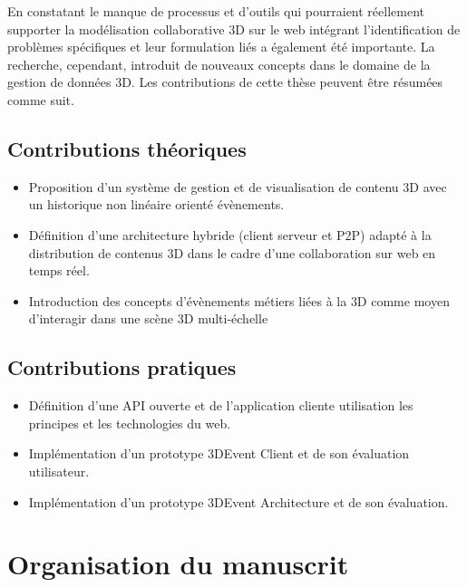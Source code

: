 En constatant le manque de processus et d'outils qui pourraient réellement supporter la modélisation collaborative \gls{3D} sur le web intégrant l'identification de problèmes spécifiques et leur formulation liés a également été importante. 
La recherche, cependant, introduit de nouveaux concepts dans le domaine de la gestion de 
données \gls{3D}. Les contributions de cette thèse peuvent être résumées comme 
suit.


\subsection{Contributions théoriques}

\begin{itemize}
	\item {}Proposition d'un système de 
	gestion et de visualisation de contenu \gls{3D} avec un historique non linéaire 
	orienté évènements.
	\item Définition d'une architecture hybride (client serveur et \gls{P2P}) adapté à 
	la distribution de contenus \gls{3D} dans le cadre d'une collaboration sur web en 
	temps réel.
	\item Introduction des concepts d'évènements métiers liées à la \gls{3D} 
	comme moyen d'interagir dans une scène  \gls{3D} multi-échelle
\end{itemize}
\subsection{Contributions pratiques}
\begin{itemize}
	\item {}Définition d'une API ouverte et 
	de l'application cliente utilisation les principes et les technologies du web.
	\item Implémentation d'un prototype 3DEvent Client et de son évaluation 
	utilisateur. 
	\item Implémentation d'un prototype 3DEvent Architecture et de son évaluation.
	
\end{itemize}


\section{Organisation du manuscrit}

